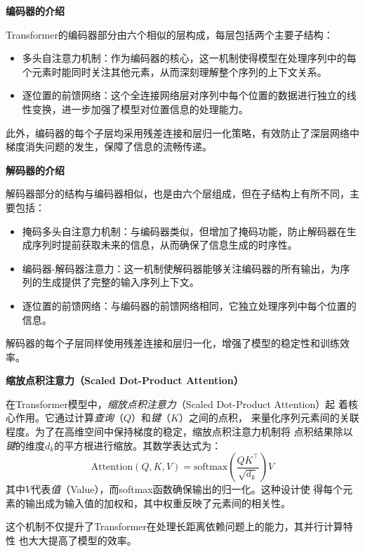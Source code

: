   \textbf{编码器的介绍}

  Transformer的编码器部分由六个相似的层构成，每层包括两个主要子结构：
  \begin{itemize}
    \item 多头自注意力机制：作为编码器的核心，这一机制使得模型在处理序列中的每个元素时能同时关注其他元素，从而深刻理解整个序列的上下文关系。
    \item 逐位置的前馈网络：这个全连接网络层对序列中每个位置的数据进行独立的线性变换，进一步加强了模型对位置信息的处理能力。
  \end{itemize}
  此外，编码器的每个子层均采用残差连接和层归一化策略，有效防止了深层网络中梯度消失问题的发生，保障了信息的流畅传递。
  
  \textbf{解码器的介绍}

  解码器部分的结构与编码器相似，也是由六个层组成，但在子结构上有所不同，主要包括：
  \begin{itemize}
    \item 掩码多头自注意力机制：与编码器类似，但增加了掩码功能，防止解码器在生成序列时提前获取未来的信息，从而确保了信息生成的时序性。
    \item 编码器-解码器注意力：这一机制使解码器能够关注编码器的所有输出，为序列的生成提供了完整的输入序列上下文。
    \item 逐位置的前馈网络：与编码器的前馈网络相同，它独立处理序列中每个位置的信息。
  \end{itemize}
  解码器的每个子层同样使用残差连接和层归一化，增强了模型的稳定性和训练效率。

  \textbf{缩放点积注意力（Scaled Dot-Product Attention）}

  在Transformer模型中，\textit{缩放点积注意力}（Scaled Dot-Product Attention）起
  着核心作用。它通过计算\textit{查询}（$Q$）和\textit{键}（$K$）之间的点积，
  来量化序列元素间的关联程度。为了在高维空间中保持梯度的稳定，缩放点积注意力机制将
  点积结果除以\textit{键}的维度$d_k$的平方根进行缩放。其数学表达式为：
  \begin{equation}
      \text{Attention}(Q, K, V) = \text{softmax}\left(\frac{QK^\top}{\sqrt{d_k}}\right)V
  \end{equation}
  其中$V$代表\textit{值}（Value），而softmax函数确保输出的归一化。这种设计使
  得每个元素的输出成为输入值的加权和，其中权重反映了元素间的相关性。
  
  这个机制不仅提升了Transformer在处理长距离依赖问题上的能力，其并行计算特性
  也大大提高了模型的效率。


